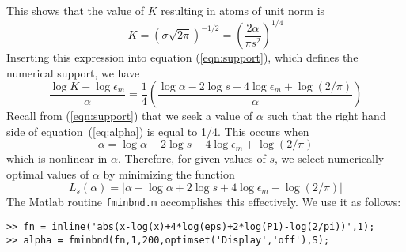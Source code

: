 This shows that the value of $K$ resulting in atoms of unit
norm is  
\[
K=(\sigma \sqrt{2\pi})^{-1/2}=\left(\frac{2\alpha}{\pi s^2}\right)^{1/4}
\]
Inserting this expression into equation (\ref{eqn:support}), which
defines the numerical support, we have
\begin{equation}
\label{eq:alpha}
\frac{\log K -\log\epsilon_m}{\alpha} =\frac{1}{4}
\left(\frac{\log\alpha-2\log s - 4\log\epsilon_m+\log(2/\pi)}
           {\alpha}\right) 
\end{equation}
Recall from (\ref{eqn:support}) that we seek a value of $\alpha$ such
that the right hand side of equation~(\ref{eq:alpha}) is
equal to 1/4.  This occurs when 
\[
\alpha = \log \alpha -2\log s - 4\log \epsilon_m+\log(2/\pi)
\]
which is nonlinear in $\alpha$.  Therefore, for given values of $s$,
we select numerically optimal values of $\alpha$ by minimizing the
function 
\[
L_s(\alpha)=
|\alpha - \log\alpha + 2\log s + 4\log\epsilon_m-\log(2/\pi)|
\]
The Matlab routine {\tt fminbnd.m} accomplishes this effectively.  We
use it as follows:
\begin{verbatim}
>> fn = inline('abs(x-log(x)+4*log(eps)+2*log(P1)-log(2/pi))',1);
>> alpha = fminbnd(fn,1,200,optimset('Display','off'),S);
\end{verbatim}






%
%
